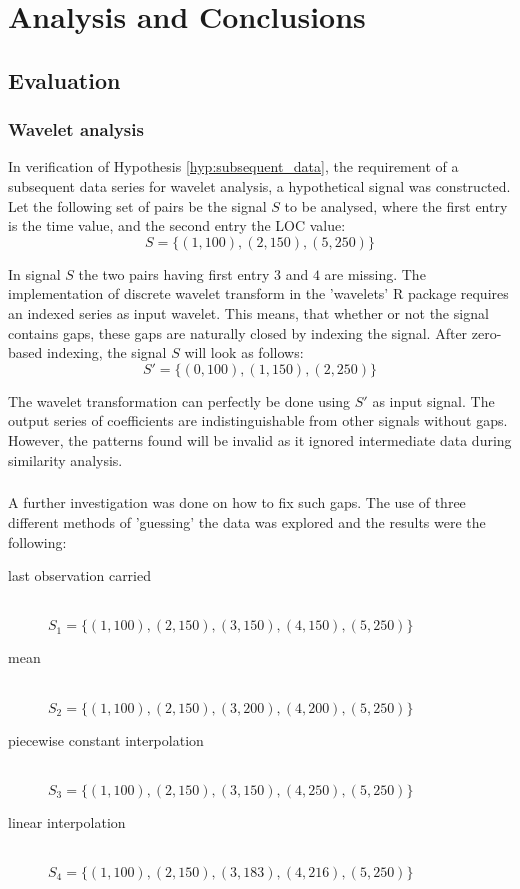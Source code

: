 \chapter{Analysis and Conclusions}
\label{analysis}

\section{Evaluation}
\subsection{Wavelet analysis}
\label{section:gapless_wavelets}
In verification of Hypothesis \ref{hyp:subsequent_data}, the requirement of a
subsequent data series for wavelet analysis, a hypothetical signal was
constructed. Let the following set of pairs be the signal $S$ to be analysed,
where the first entry is the time value, and the second entry the LOC value:
$$S = \{(1,100), (2,150), (5,250)\}$$

\noindent
In signal $S$ the two pairs having first entry $3$ and $4$ are missing. The
implementation of discrete wavelet transform in the 'wavelets' R package
requires an indexed series as input wavelet. This means, that whether or not
the signal contains gaps, these gaps are naturally closed by indexing the
signal. After zero-based indexing, the signal $S$ will look as follows:
$$S' = \{(0,100), (1,150), (2,250)\}$$

\noindent
The wavelet transformation can perfectly be done using $S'$ as input
signal. The output series of coefficients are indistinguishable from other
signals without gaps. However, the patterns found will be invalid as it ignored
intermediate data during similarity analysis.

\paragraph{}
A further investigation was done on how to fix such gaps. The use of three
different methods of 'guessing' the data was explored and the results were the
following:
\begin{description}
	\item[last observation carried] \hfill \\[1em]
	$S_{1} = \{(1,100), (2,150), (3,150), (4,150), (5,250)\}$

	\item[mean] \hfill \\[1em]
	$S_{2} = \{(1,100), (2,150), (3,200), (4,200), (5,250)\}$
	
	\item[piecewise constant interpolation] \hfill \\[1em]
	$S_{3} = \{(1,100), (2,150), (3,150), (4,250), (5,250)\}$
	
	\item[linear interpolation] \hfill \\[1em]
	$S_{4} = \{(1,100), (2,150), (3,183), (4,216), (5,250)\}$
\end{description}

